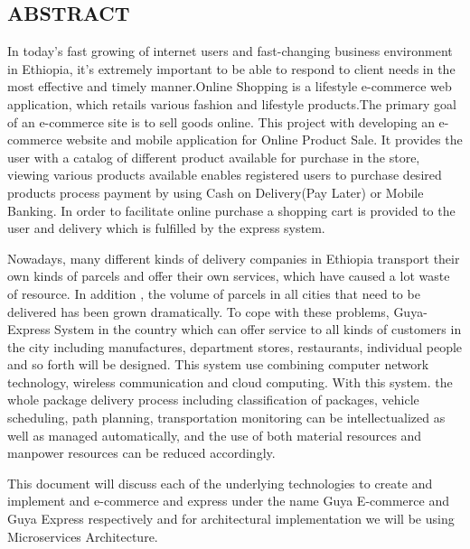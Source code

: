 \begin{center}
\section*{ABSTRACT}
\end{center}
\begin{normalsize}
\doublespacing
In today's fast growing of internet users and fast-changing business environment in Ethiopia, it's extremely important to be able to respond to client needs in the most effective and timely manner.Online Shopping is a lifestyle e-commerce web application, which retails various fashion and lifestyle products.The primary goal of an e-commerce site is to sell goods online. This project with developing an e-commerce website and mobile application for Online Product Sale. It provides the user with a catalog of different product available for purchase in the store, viewing various products available enables registered users to purchase desired products process payment by using Cash on Delivery(Pay Later) or Mobile Banking. In order to facilitate online purchase a shopping cart is provided to the user and delivery which is fulfilled by the express system.

Nowadays, many different kinds of delivery companies in Ethiopia transport their own kinds of parcels and offer their own services, which have caused a lot waste of resource. In addition , the volume of parcels in all cities that need to be delivered has been grown dramatically. To cope with these problems, Guya-Express System in the country which can offer service to all kinds of customers in the city including manufactures, department stores, restaurants, individual people and so forth will be designed. This system use combining computer network technology, wireless communication and cloud computing. With this system. the whole package delivery process including classification of packages, vehicle scheduling, path planning, transportation monitoring can be intellectualized as well as managed automatically, and the use of both material resources and manpower resources can be reduced accordingly.

This document will discuss each of the underlying technologies to create and implement and e-commerce and express under the name Guya E-commerce and Guya Express respectively and for architectural implementation we will be using Microservices Architecture.
\end{normalsize}
